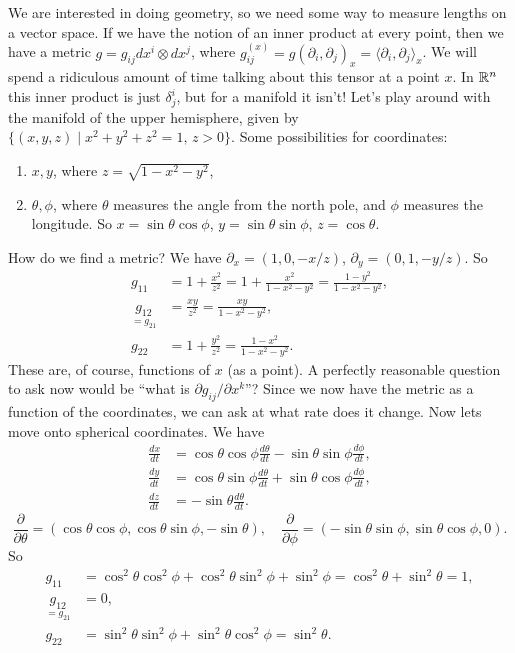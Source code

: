  We are interested in doing geometry, so we need some way to measure lengths on a vector space. If we have the notion of an inner product at every point, then we have a metric $g= g_{ij}dx^i  \otimes dx^j $, where $g_{ij}^{(x)}=g(\partial _i  , \partial _j )_x= \langle \partial _i , \partial _j  \rangle _x$. We will spend a ridiculous amount of time talking about this tensor at a point $x$. In $\mathbb{R}^n $ this inner product is just $\delta^i _j $, but for a manifold it isn't! Let's play around with the manifold of the upper hemisphere, given by $\{(x,y,z)  \mid  x^2+y^2+z^2=1, \, z>0\} $. Some possibilities for coordinates:
\begin{enumerate}
    \item $x,y$, where $z= \sqrt{1-x^2-y^2} $,
    \item $\theta, \phi$, where $\theta$ measures the angle from the north pole, and $\phi$ measures the longitude. So $x=\sin \theta \cos \phi$, $y= \sin \theta \sin \phi$, $z = \cos \theta$.
\end{enumerate}
How do we find a metric? We have $\partial _x=(1,0,-x /z)$, $\partial _y=(0,1,-y /z)$. So 
\begin{align*}
    g_{11}&=1+ \frac{x^2}{z^2}=1+ \frac{x^2}{1-x^2-y^2}=\frac{1-y^2}{1-x^2-y^2},\\
    \underset{=g_{21}}{g_{12}} &=\frac{xy}{z^2}=\frac{xy}{1-x^2-y^2},\\
    g_{22}&=1+\frac{y^2}{z^2}=\frac{1-x^2}{1-x^2-y^2}.
\end{align*}
These are, of course, functions of $x$ (as a point). A perfectly reasonable question to ask now would be ``what is $\partial g_{ij}/\partial x^k$''? Since we now have the metric as a function of the coordinates, we can ask at what rate does it change. Now lets move onto spherical coordinates. We have 
\begin{align*}
    \frac{dx}{dt}&=\cos \theta \cos \phi \frac{d\theta}{dt}-\sin \theta \sin \phi \frac{d\phi}{dt},\\
    \frac{dy}{dt}&=\cos \theta \sin \phi \frac{d\theta}{dt}+\sin\theta \cos \phi \frac{d\phi}{dt},\\
    \frac{dz}{dt}&=-\sin \theta \frac{d\theta}{dt}.
\end{align*}
\[
    \frac{\partial }{\partial \theta}=\left( \cos \theta \cos \phi, \cos \theta \sin \phi, -\sin \theta \right) ,\quad \frac{\partial }{\partial \phi}=\left( -\sin \theta \sin \phi, \sin\theta \cos \phi,0 \right) .
\] So
\begin{align*}
    g_{11}&=\cos ^2 \theta \cos ^2 \phi + \cos ^2 \theta \sin ^2 \phi + \sin ^2 \phi=\cos ^2 \theta+\sin ^2 \theta=1,\\
    \underset{=g_{21}}{g_{12}} &=0,\\
    g_{22}&=\sin ^2 \theta \sin ^2 \phi+ \sin ^2 \theta \cos ^2 \phi=\sin ^2 \theta.
\end{align*}
